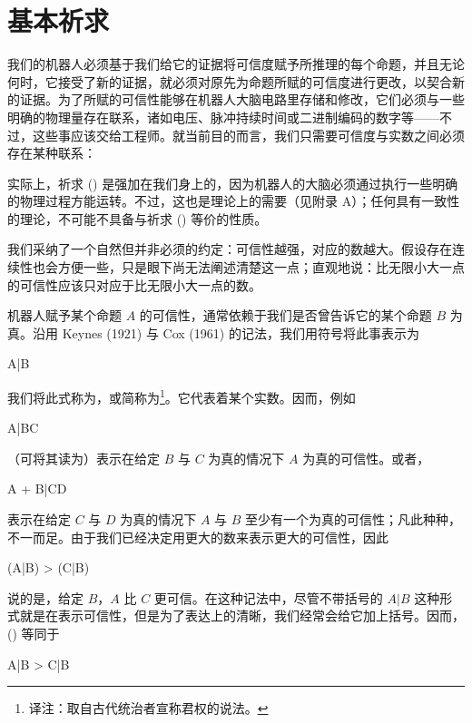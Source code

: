 \section{基本祈求}

我们的机器人必须基于我们给它的证据将可信度赋予所推理的每个命题，并且无论何时，它接受了新的证据，就必须对原先为命题所赋的可信度进行更改，以契合新的证据。为了所赋的可信性能够在机器人大脑电路里存储和修改，它们必须与一些明确的物理量存在联系，诸如电压、脉冲持续时间或二进制编码的数字等——不过，这些事应该交给工程师。就当前目的而言，我们只需要可信度与实数之间必须存在某种联系：

\placeformula[desiderata-1]
\startformula
{}\quad{}
\stopformula

实际上，祈求 () 是强加在我们身上的，因为机器人的大脑必须通过执行一些明确的物理过程方能运转。不过，这也是理论上的需要（见附录 A）；任何具有一致性的理论，不可能不具备与祈求 () 等价的性质。

我们采纳了一个自然但并非必须的约定：可信性越强，对应的数越大。假设存在连续性也会方便一些，只是眼下尚无法阐述清楚这一点；直观地说：比无限小大一点的可信性应该只对应于比无限小大一点的数。

机器人赋予某个命题 $A$ 的可信性，通常依赖于我们是否曾告诉它的某个命题 $B$ 为真。沿用 Keynes (1921) 与 Cox (1961) 的记法，我们用符号将此事表示为

\placeformula
\startformula
A|B
\stopformula

我们将此式称为，或简称为\footnote{译注：取自古代统治者宣称君权的说法。}。它代表着某个实数。因而，例如

\placeformula
\startformula
A|BC
\stopformula

（可将其读为）表示在给定 $B$ 与 $C$ 为真的情况下 $A$ 为真的可信性。或者，

\placeformula
\startformula
A + B|CD
\stopformula

表示在给定 $C$ 与 $D$ 为真的情况下 $A$ 与 $B$ 至少有一个为真的可信性；凡此种种，不一而足。由于我们已经决定用更大的数来表示更大的可信性，因此

\placeformula[1-32]
\startformula
(A|B) > (C|B)
\stopformula

说的是，给定 $B$，$A$ 比 $C$ 更可信。在这种记法中，尽管不带括号的 $A|B$ 这种形式就是在表示可信性，但是为了表达上的清晰，我们经常会给它加上括号。因而，(\in[1-32]) 等同于

\placeformula
\startformula
A|B > C|B
\stopformula

